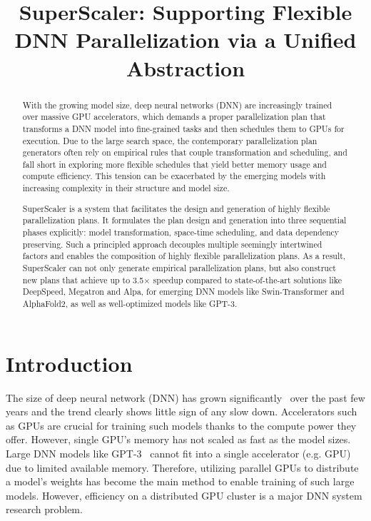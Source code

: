 \title{{SuperScaler}: Supporting Flexible DNN Parallelization via a Unified Abstraction}

\begin{abstract}
 With the growing model size, deep neural networks (DNN) are increasingly trained over massive GPU accelerators, which demands a proper parallelization plan that transforms a DNN model into fine-grained tasks and then schedules them to GPUs for execution. Due to the large search space, the contemporary parallelization plan generators often rely on empirical rules that couple transformation and scheduling, and fall short in exploring more flexible schedules that yield better memory usage and compute efficiency. This tension can be exacerbated by the emerging models with increasing complexity in their structure and model size.

{SuperScaler} is a system that facilitates the design and generation of highly flexible parallelization plans. It formulates the plan design and generation into three sequential phases explicitly: model transformation, space-time scheduling, and data dependency preserving. Such a principled approach decouples multiple seemingly intertwined factors and enables the composition of highly flexible parallelization plans. As a result, {SuperScaler} can not only generate empirical parallelization plans, but also construct new plans that achieve up to 3.5$\times$ speedup compared to state-of-the-art solutions like DeepSpeed, Megatron and Alpa, for emerging DNN models like Swin-Transformer and AlphaFold2, as well as well-optimized models like GPT-3.
\end{abstract}

\section{Introduction}
\label{sec:intro}

The size of deep neural network (DNN) has grown significantly~\cite{gpt-3, swin-v2, palm} over the past few years and the trend clearly shows little sign of any slow down. Accelerators such as GPUs are crucial for training such models thanks to the compute power they offer. However, single GPU's memory has not scaled as fast as the model sizes. Large DNN models like GPT-3~\cite{gpt-3} cannot fit into a single accelerator (e.g. GPU) due to limited available memory. Therefore, utilizing parallel GPUs to distribute a model's weights has become the main method to enable training of such large models. However, efficiency on a distributed GPU cluster is a major DNN system research problem. 

